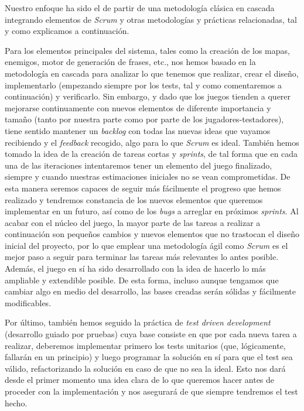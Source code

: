 Nuestro enfoque ha sido el de partir de una metodología clásica en cascada integrando elementos de \textit{Scrum} y otras metodologías y prácticas relacionadas, tal y como explicamos a continuación.

Para los elementos principales del sistema, tales como la creación de los mapas, enemigos, motor de generación de frases, etc., nos hemos basado en la metodología en cascada para analizar lo que tenemos que realizar, crear el diseño, implementarlo (empezando siempre por los tests, tal y como comentaremos a continuación) y verificarlo. Sin embargo, y dado que los juegos tienden a querer mejorarse continuamente con nuevos elementos de diferente importancia y tamaño (tanto por nuestra parte como por parte de los jugadores-testadores), tiene sentido mantener un \textit{backlog} con todas las nuevas ideas que vayamos recibiendo y el \textit{feedback} recogido, algo para lo que \textit{Scrum} es ideal. 
También hemos tomado la idea de la creación de tareas cortas y \textit{sprints}, de tal forma que en cada una de las iteraciones intentaremos tener un elemento del juego finalizado, siempre y cuando nuestras estimaciones iniciales no se vean comprometidas. De esta manera seremos capaces de seguir más fácilmente el progreso que hemos realizado y tendremos constancia de los nuevos elementos que queremos implementar en un futuro, así como de los \textit{bugs} a arreglar en próximos \textit{sprints}.
Al acabar con el núcleo del juego, la mayor parte de las tareas a realizar a continuación son pequeños cambios y nuevos elementos que no trastocan el diseño inicial del proyecto, por lo que emplear una metodología ágil como \textit{Scrum} es el mejor paso a seguir para terminar las tareas más relevantes lo antes posible. Además, el juego en sí ha sido desarrollado con la idea de hacerlo lo más ampliable y extendible posible. De esta forma, incluso aunque tengamos que cambiar algo en medio del desarrollo, las bases creadas serán sólidas y fácilmente modificables. 

Por último, también hemos seguido la práctica de \textit{test driven development} (desarrollo guiado por pruebas) cuya base consiste en que por cada nueva tarea a realizar, deberemos implementar primero los tests unitarios (que, lógicamente, fallarán en un principio) y luego programar la solución en sí para que el test sea válido, refactorizando la solución en caso de que no sea la ideal. Esto nos dará desde el primer momento una idea clara de lo que queremos hacer antes de proceder con la implementación y nos asegurará de que siempre tendremos el test hecho.